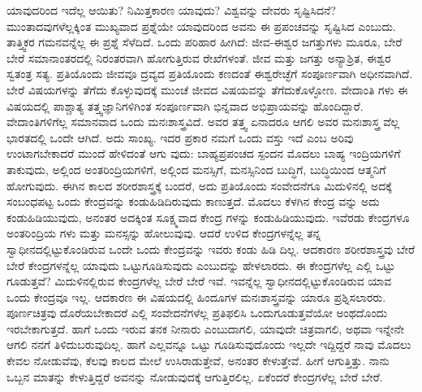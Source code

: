ಯಾವುದರಿಂದ ಇದೆಲ್ಲ ಆಯಿತು? ನಿಮಿತ್ತಕಾರಣ ಯಾವುದು? ವಿಶ್ವವನ್ನು ದೇವರು ಸೃಷ್ಟಿಸಿದನೆ? ಮುಂತಾದವುಗಳೆಲ್ಲಕ್ಕಿಂತ ಮುಖ್ಯವಾದ ಪ್ರಶ್ನೆಯೇ ಯಾವುದರಿಂದ ಅವನು ಈ ಪ್ರಪಂಚವನ್ನು ಸೃಷ್ಟಿಸಿದ ಎಂಬುದು. ತಾತ್ತ್ವಿಕರ ಗಮನವನ್ನೆಲ್ಲ ಈ ಪ್ರಶ್ನೆ ಸೆಳೆದಿದೆ. ಒಂದು ಪರಿಹಾರ ಹೀಗಿದೆ: ಜೀವ-ಈಶ್ವರ ಜಗತ್ತುಗಳು ಮೂರೂ, ಬೇರೆ ಬೇರೆ ಸಮಾನಾಂತರದಲ್ಲಿ ನಿರಂತರವಾಗಿ ಹೋಗುತ್ತಿರುವ ರೇಖೆಗಳಂತೆ. ಜೀವ ಮತ್ತು ಜಗತ್ತು ಅನ್ಯಾಶ್ರಿತ, ಈಶ್ವರ ಸ್ವತಂತ್ರ ಸತ್ಯ. ಪ್ರತಿಯೊಂದು ಜೀವವೂ ದ್ರವ್ಯದ ಪ್ರತಿಯೊಂದು ಕಣದಂತೆ ಈಶ್ವರೇಚ್ಛೆಗೆ ಸಂಪೂರ್ಣವಾಗಿ ಅಧೀನವಾಗಿದೆ. ಬೇರೆ ವಿಷಯಗಳನ್ನು ತೆಗೆದು ಕೊಳ್ಳುವುದಕ್ಕೆ ಮುಂಚೆ ಜೀವದ ವಿಷಯವನ್ನು ತೆಗೆದುಕೊಳ್ಳೋಣ. ವೇದಾಂತಿ ಗಳು ಈ ವಿಷಯದಲ್ಲಿ ಪಾಶ್ಚಾತ್ಯ ತತ್ತ್ವಜ್ಞಾನಿಗಳಿಗಿಂತ ಸಂಪೂರ್ಣವಾಗಿ ಭಿನ್ನವಾದ ಅಭಿಪ್ರಾಯವನ್ನು ಹೊಂದಿದ್ದಾರೆ. ವೇದಾಂತಿಗಳಿಗೆಲ್ಲ ಸಮಾನವಾದ ಒಂದು ಮನಃಶಾಸ್ತ್ರವಿದೆ. ಅವರ ತತ್ತ್ವ ಏನಾದರೂ ಆಗಲಿ ಅವರ ಮನಃಶಾಸ್ತ್ರ ವೆಲ್ಲ ಭಾರತದಲ್ಲಿ ಒಂದೇ ಆಗಿದೆ. ಅದು ಸಾಂಖ್ಯ. ಇದರ ಪ್ರಕಾರ ನಮಗೆ ಒಂದು ವಸ್ತು ಇದೆ ಎಂಬ ಅರಿವು ಉಂಟಾಗಬೇಕಾದರೆ ಮುಂದೆ ಹೇಳಿದಂತೆ ಆಗು ವುದು: ಬಾಹ್ಯಪ್ರಪಂಚದ ಸ್ಪಂದನ ಮೊದಲು ಬಾಹ್ಯ ಇಂದ್ರಿಯಗಳಿಗೆ ತಾಕುವುದು, ಅಲ್ಲಿಂದ ಅಂತರಿಂದ್ರಿಯಗಳಿಗೆ, ಅಲ್ಲಿಂದ ಮನಸ್ಸಿಗೆ, ಮನಸ್ಸಿನಿಂದ ಬುದ್ಧಿಗೆ, ಬುದ್ಧಿಯಿಂದ ಆತ್ಮನಿಗೆ ಹೋಗುವುದು. ಈಗಿನ ಕಾಲದ ಶರೀರಶಾಸ್ತ್ರಕ್ಕೆ ಬಂದರೆ, ಅದು ಪ್ರತಿಯೊಂದು ಸಂವೇದನೆಗೂ ಮಿದುಳಿನಲ್ಲಿ ಅದಕ್ಕೆ ಸಂಬಂಧಪಟ್ಟ ಒಂದು ಕೇಂದ್ರವನ್ನು ಕಂಡುಹಿಡಿದಿರುವುದು ಕಾಣುತ್ತದೆ. ಮೊದಲು ಕೆಳಗಿನ ಕೇಂದ್ರ ವನ್ನು ಅದು ಕಂಡುಹಿಡಿಯುವುದು, ಅನಂತರ ಅದಕ್ಕಿಂತ ಸೂಕ್ಷ್ಮವಾದ ಕೇಂದ್ರ ಗಳನ್ನು ಕಂಡುಹಿಡಿಯುವುದು. ಇವೆರಡು ಕೇಂದ್ರಗಳೂ ಅಂತರಿಂದ್ರಿಯ ಗಳು ಮತ್ತು ಮನಸ್ಸನ್ನು ಹೋಲುವುವು. ಆದರೆ ಉಳಿದ ಕೇಂದ್ರಗಳನ್ನೆಲ್ಲ ತನ್ನ ಸ್ವಾಧೀನದಲ್ಲಿಟ್ಟುಕೊಂಡಿರುವ ಒಂದೇ ಒಂದು ಕೇಂದ್ರವನ್ನು ಇವರು ಕಂಡು ಹಿಡಿ ದಿಲ್ಲ. ಆದಕಾರಣ ಶರೀರಶಾಸ್ತ್ರವು ಬೇರೆ ಬೇರೆ ಕೇಂದ್ರಗಳನ್ನೆಲ್ಲ ಯಾವುದು ಒಟ್ಟುಗೂಡಿಸುವುದು ಎಂಬುದನ್ನು ಹೇಳಲಾರದು. ಈ ಕೇಂದ್ರಗಳೆಲ್ಲ ಎಲ್ಲಿ ಒಟ್ಟು ಗೂಡುತ್ತವೆ? ಮಿದುಳಿನಲ್ಲಿರುವ ಕೇಂದ್ರಗಳೆಲ್ಲ ಬೇರೆ ಬೇರೆ ಇವೆ. ಇವನ್ನೆಲ್ಲ ಸ್ವಾಧೀನದಲ್ಲಿಟ್ಟುಕೊಂಡಿರುವ ಯಾವ ಒಂದು ಕೇಂದ್ರವೂ ಇಲ್ಲ. ಆದಕಾರಣ ಈ ವಿಷಯದಲ್ಲಿ ಹಿಂದೂಗಳ ಮನಃಶಾಸ್ತ್ರವನ್ನು ಯಾರೂ ಪ್ರಶ್ನಿಸಲಾರರು. ಪೂರ್ಣಚಿತ್ರವು ದೊರೆಯಬೇಕಾದರೆ ಎಲ್ಲಿ ಸಂವೇದನೆಗಳೆಲ್ಲ ಪ್ರತಿಫಲಿಸಿ ಒಂದುಗೂಡುತ್ತವೆಯೋ ಅಂಥದೊಂದು ಇರಬೇಕಾಗುತ್ತದೆ. ಹಾಗೆ ಒಂದು ಇರುವ ತನಕ ನೀನಾರು ಎಂಬುದಾಗಲಿ, ಯಾವುದೇ ಚಿತ್ರವಾಗಲಿ, ಅಥವಾ ಇನ್ನೇನೇ ಆಗಲಿ ನನಗೆ ತಿಳಿದುಬರುವುದಿಲ್ಲ. ಹಾಗೆ ಎಲ್ಲವನ್ನೂ ಒಟ್ಟು ಗೂಡಿಸುವುದೊಂದು ಇಲ್ಲದೇ ಇದ್ದಿದ್ದರೆ ನಾವು ಮೊದಲು ಕೇವಲ ನೋಡುವೆವು, ಕೆಲವು ಕಾಲದ ಮೇಲೆ ಉಸಿರಾಡುತ್ತೇವೆ, ಅನಂತರ ಕೇಳುತ್ತೇವೆ. ಹೀಗೆ ಆಗುತ್ತಿತ್ತು. ನಾನು ಒಬ್ಬನ ಮಾತನ್ನು ಕೇಳುತ್ತಿದ್ದರೆ ಅವನನ್ನು ನೋಡುವುದಕ್ಕೆ ಆಗುತ್ತಿರಲಿಲ್ಲ. ಏಕೆಂದರೆ ಕೇಂದ್ರಗಳೆಲ್ಲ ಬೇರೆ ಬೇರೆ.


